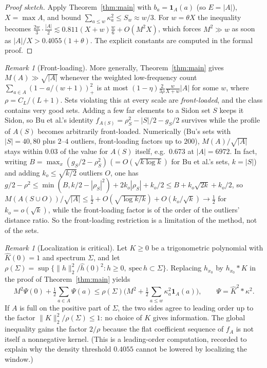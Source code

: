 \documentclass[11pt]{amsart}
\theoremstyle{remark}
\newtheorem{remark}[theorem]{Remark}
\begin{document}
\begin{proof}[Proof sketch]
Apply Theorem~\ref{thm:main} with $b_a=\mathbf 1_A(a)$ (so $E=|A|$), $X=\max A$, and bound
$\sum_{a\le w}\kappa_a^2\le S_w\approx w/3$. For $w=\theta X$ the inequality becomes
$\frac{2w}{3}\cdot\frac{|A|}2\lesssim 0.811(X+w)\frac{w}{6}+O(M^2X)$, which forces $M^2\gg w$ as soon as
$|A|/X>0.4055(1+\theta)$. The explicit constants are computed in the formal proof.
\end{proof}

\begin{remark}[Front-loading]
More generally, Theorem~\ref{thm:main} gives $M(A)\gg\sqrt{|A|}$ whenever the weighted low-frequency count
$\sum_{a\in A}(1-a/(w+1))_+^2$ is at most $(1-\eta)\frac{2}{3\rho}\frac{w}{X+w}|A|$ for some $w$, where
$\rho=C_L/(L+1)$. Sets violating this at every scale are \emph{front-loaded}, and the class contains very good sets.
Adding a few far elements to a Sidon set $S$ keeps it Sidon, so Bu et al.'s identity
$f_{A(S)}=\rho_S^2-|S|/2-g_S/2$ survives while the profile of $A(S)$ becomes arbitrarily front-loaded. Numerically
(Bu's sets with $|S|=40,80$ plus $2$--$4$ outliers, front-loading factors up to $200$), $M(A)/\sqrt{|A|}$ stays within
$0.03$ of the value for $A(S)$ itself, e.g.\ $0.673$ at $|A|=6972$. In fact, writing $B=\max_x(g_S/2-\rho_S^2)$
($=O(\sqrt{k\log k})$ for Bu et al.'s sets, $k=|S|$) and adding $k_o\le\sqrt{k/2}$ outliers $O$, one has
$g/2-\rho^2\le\min(B,k/2-|\rho_S|^2)+2k_o|\rho_S|+k_o/2\le B+k_o\sqrt{2k}+k_o/2$, so
$M(A(S\cup O))/\sqrt{|A|}\le\frac12+O(\sqrt{\log k/k})+O(k_o/\sqrt k)\to\frac12$ for $k_o=o(\sqrt k)$, while the
front-loading factor is of the order of the outliers' distance ratio. So the front-loading restriction is a limitation of
the method, not of the sets.
\end{remark}

\begin{remark}[Localization is critical]
Let $K\ge0$ be a trigonometric polynomial with $\hat K(0)=1$ and spectrum $\Sigma$, and let
$\rho(\Sigma)=\sup\{\|h\|_2^2/\hat h(0)^2: h\ge0,\ \mathrm{spec}\,h\subset\Sigma\}$. Replacing $h_{x_0}$ by
$h_{x_0}*K$ in the proof of Theorem~\ref{thm:main} yields
\[
M^2\Psi(0)+\tfrac12\sum_{a\in A}\Psi(a)\le\rho(\Sigma)\Big(M^2+\tfrac12\sum_{a\le w}\kappa_a^2\mathbf 1_A(a)\Big),
\qquad \Psi=\hat K^2*\kappa^2 .
\]
If $A$ is full on the positive part of $\Sigma$, the two sides agree to leading order up to the factor
$\|K\|_2^2/\rho(\Sigma)\le1$: no choice of $K$ gives information. The global inequality gains the factor $2/\rho$
because the flat coefficient sequence of $f_A$ is not itself a nonnegative kernel. (This is a leading-order
computation, recorded to explain why the density threshold $0.4055$ cannot be lowered by localizing the window.)
\end{remark}
\end{document}
